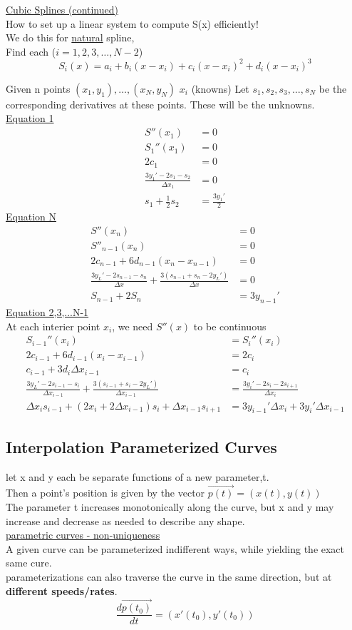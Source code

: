 \documentclass[10pt,usletter]{article}
\begin{document}
\underline{Cubic Splines (continued)}\\
How to set up a linear system to compute S(x) efficiently!\\
We do this for \underline{natural} spline,\\
Find each ($i=1,2,3,\hdots,N-2$)
$$S_i(x)=a_i+b_i(x-x_i)+c_i(x-x_i)^2+d_i(x-x_i)^3$$

Given n points $(x_1, y_1),\hdots, (x_N, y_N)$ $x_i$ (knowns)
Let $s_1,s_2,s_3,\hdots,s_N$ be the corresponding derivatives at these points. These will be the unknowns.\\
\underline{Equation 1}
\begin{align*}
S''(x_1)&=0 \\
S_1''(x_1)&=0 \\
2c_1&=0\\
\frac{3y_1'-2s_1-s_2}{\Delta x_1}&=0\\
s_1+\frac{1}{2}s_2&=\frac{3y_1'}{2}
\end{align*}
\underline{Equation N}
\begin{align*}
S''(x_n)&=0\\
S''_{n-1}(x_n)&=0\\
2c_{n-1}+6d_{n-1}(x_n-x_{n-1})&=0\\
\frac{3y_L'-2s_{n-1}-s_{n}}{\Delta x}+\frac{3(s_{n-1}+s_n-2y_L')}{\Delta x}&=0\\
S_{n-1}+2S_n&=3y_{n-1}'
\end{align*}
\underline{Equation 2,3,...N-1}\\
At each interier point $x_i$, we need $S''(x)$ to be continuous
\begin{align*}
S_{i-1}''(x_i)&=S_i''(x_i)\\
2c_{i-1}+6d_{i-1}(x_i-x_{i-1})&=2c_i\\
c_{i-1}+3d_i\Delta x_{i-1}&=c_i\\
\frac{3y_L'-2s_{i-1}-s_i}{\Delta x_{i-1}}+\frac{3(s_{i-1}+s_i-2y_L')}{\Delta x_{i-1}}&=\frac{3y_i'-2s_i-2s_{i+1}}{\Delta x_i}\\
\Delta x_i s_{i-1}+(2x_i+2\Delta x_{i-1}) s_i+ \Delta x_{i-1}s_{i+1}&=3y_{i-1}'\Delta x_i + 3y_i' \Delta x_{i-1}
\end{align*}
\subsection{Interpolation Parameterized Curves}
let x and y each be separate functions of a new parameter,t.\\
Then a point's position is given by the vector $\vec{p(t)}=(x(t),y(t))$\\
The parameter t increases monotonically along the curve, but x and y may increase and decrease as needed to describe any shape.\\
\underline{parametric curves - non-uniqueness}\\
A given curve can be parameterized indifferent ways, while yielding the exact same cure.\\
parameterizations can also traverse the curve in the same direction, but at \textbf{different speeds/rates}.\\
$$\frac{d\vec{p(t_0)}}{dt}=(x'(t_0),y'(t_0))$$
\end{document}
